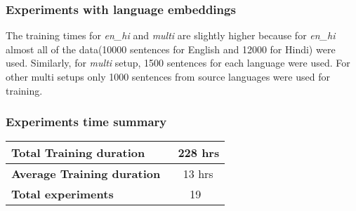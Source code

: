 \subsubsection{Experiments with language embeddings}
\begin{table}[ht]
    \begin{center}
        \caption{Training duration with language embeddings}
        \label{table:experiments_durations_em}
    \end{center}
\end{table}
The training times for \textit{en\_hi} and \textit{multi} are slightly higher
because for \textit{en\_hi} almost all of the data(10000 sentences for English
and 12000 for Hindi) were used. Similarly, for \textit{multi} setup, 1500
sentences for each language were used. For other multi setups only 1000
sentences from source languages were used for training.

\subsubsection{Experiments time summary}
\begin{table}[ht]
    \begin{center}
        \begin{tabular}{|l|c|}
            \hline
            \textbf{Total Training duration} & ~228 hrs \\
            \hline
            \textbf{Average Training duration} & ~13 hrs \\
            \hline
            \textbf{Total experiments} & 19 \\
            \hline
        \end{tabular}
    \end{center}
\end{table}

